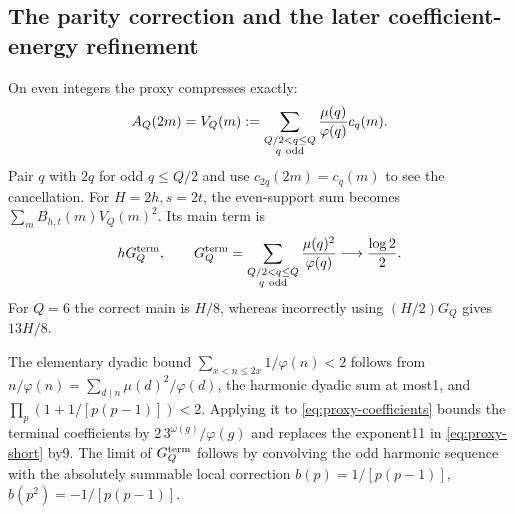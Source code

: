 \documentclass[11pt,a4paper]{article}
\theoremstyle{definition}
\theoremstyle{remark}
\begin{document}
\subsection{The parity correction and the later coefficient-energy refinement}
On even integers the proxy compresses exactly:
\begin{equation}\label{eq:proxy-parity}
 A_Q(2m)=V_Q(m):=\sum_{\substack{Q/2<q\le Q\\q\ {\rm odd}}}
 \frac{\mu(q)}{\varphi(q)}c_q(m).
\end{equation}
Pair $q$ with $2q$ for odd $q\le Q/2$ and use $c_{2q}(2m)=c_q(m)$ to see the cancellation. For $H=2h,s=2t$, the even-support sum becomes $\sum_mB_{h,t}(m)V_Q(m)^2$. Its main term is
\[hG_Q^{\rm term},\qquad G_Q^{\rm term}=
 \sum_{\substack{Q/2<q\le Q\\q\ {\rm odd}}}\frac{\mu(q)^2}{\varphi(q)}
 \longrightarrow\frac{\log2}{2}.\]
For $Q=6$ the correct main is $H/8$, whereas incorrectly using $(H/2)G_Q$ gives $13H/8$.

The elementary dyadic bound $\sum_{x<n\le2x}1/\varphi(n)<2$ follows from
$n/\varphi(n)=\sum_{d\mid n}\mu(d)^2/\varphi(d)$, the harmonic dyadic sum at most1, and $\prod_p(1+1/[p(p-1)])<2$. Applying it to \eqref{eq:proxy-coefficients} bounds the terminal coefficients by $2\,3^{\omega(g)}/\varphi(g)$ and replaces the exponent11 in \eqref{eq:proxy-short} by9. The limit of $G_Q^{\rm term}$ follows by convolving the odd harmonic sequence with the absolutely summable local correction $b(p)=1/[p(p-1)]$, $b(p^2)=-1/[p(p-1)]$.
\end{document}
